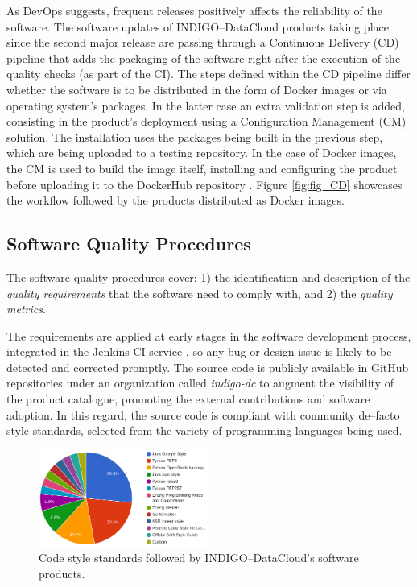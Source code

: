 \documentclass[journal]{IEEEtran}
\begin{document}
As DevOps suggests, frequent releases positively affects the reliability of the software. The software updates of INDIGO--DataCloud products taking place since the second major release are passing through a Continuous Delivery (CD) pipeline that adds the packaging of the software right after the execution of the quality checks (as part of the CI). The steps defined within the CD pipeline differ whether the software is to be distributed in the form of Docker images or via operating system’s packages. In the latter case an extra validation step is added, consisting in the product’s deployment using a Configuration Management (CM) solution. The installation uses the packages being built in the previous step, which are being uploaded to a testing repository. In the case of Docker images, the CM is used to build the image itself, installing and configuring the product before uploading it to the DockerHub repository \cite{indigo-dockerhub}. Figure \ref{fig:fig_CD} showcases the workflow followed by the products distributed as Docker images.

\subsection{Software Quality Procedures}

The software quality procedures \cite{indigo-d31} cover: 1) the identification and description of the \emph{quality requirements} that the software need to comply with, and 2) the \emph{quality metrics}.

The requirements are applied at early stages in the software development process, integrated in the Jenkins CI service \cite{indigo-jenkins}, so any bug or design issue is likely to be detected and corrected promptly. The source code is publicly available in GitHub repositories under an organization called {\sl indigo-dc} \cite{indigo-github} to augment the visibility of the product catalogue, promoting the external contributions and software adoption. In this regard, the source code is compliant with community de--facto style standards, selected from the variety of programming languages being used.

\begin{figure}[!t]
\centering
\includegraphics[width=0.5\textwidth]{images/codestyle.png}
\caption{Code style standards followed by INDIGO--DataCloud's software products.}
\label{fig:fig_codestyle}
\end{figure}
\end{document}
